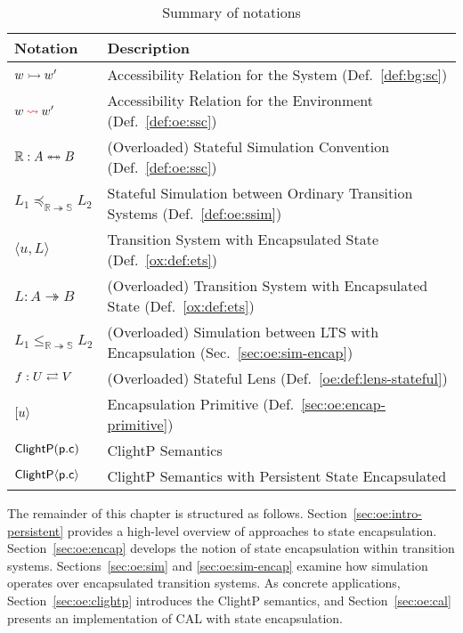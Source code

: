 \begin{table}
  \centering
  \begin{tabular}{ll}
    \toprule
    Notation & Description\\
    \midrule
    $w \rightarrowtail w'$ & Accessibility Relation for the System (Def.~\ref{def:bg:sc})\\
    $w \mathbin{\color{red}{\leadsto}} w'$ & Accessibility Relation for the Environment (Def.~\ref{def:oe:ssc})\\
    $\mathbb{R} : A \twoheadleftarrow \mathrel{\mkern-15mu} \twoheadrightarrow B$ & (Overloaded) Stateful Simulation Convention (Def.~\ref{def:oe:ssc})\\
    $L_1 \preceq_{\mathbb{R} \twoheadrightarrow \mathbb{S}} L_2$ & Stateful Simulation between Ordinary Transition Systems (Def.~\ref{def:oe:ssim})\\
    $\langle u, L \rangle$ & Transition System with Encapsulated State (Def.~\ref{ox:def:ets})\\
    $L : A \twoheadrightarrow B$ & (Overloaded) Transition System with Encapsulated State (Def.~\ref{ox:def:ets})\\
    $L_1 \le_{\mathbb{R} \twoheadrightarrow \mathbb{S}} L_2$ & (Overloaded) Simulation between LTS with Encapsulation (Sec.~\ref{sec:oe:sim-encap})\\
    $f : U \rightleftarrows V$ & (Overloaded) Stateful Lens (Def.~\ref{oe:def:lens-stateful})\\
    $[ {u} \rangle$ & Encapsulation Primitive (Def.~\ref{sec:oe:encap-primitive})\\
    $ \mathsf{ClightP} ( \mathsf{p.c} )$ & ClightP Semantics\\
    $ \mathsf{ClightP} \langle  \mathsf{p.c}  \rangle$ & ClightP Semantics with Persistent State Encapsulated\\
    \bottomrule
  \end{tabular}
  \caption{Summary of notations}
  \label{tab:oe:notations}
\end{table}

The remainder of this chapter is structured as follows.
Section~\ref{sec:oe:intro-persistent} provides a high-level overview of approaches to state encapsulation.
Section~\ref{sec:oe:encap} develops the notion of state encapsulation within transition systems.
Sections~\ref{sec:oe:sim} and \ref{sec:oe:sim-encap} examine how simulation operates over encapsulated transition systems.
As concrete applications, Section~\ref{sec:oe:clightp} introduces the ClightP semantics, and Section~\ref{sec:oe:cal} presents an implementation of CAL with state encapsulation.

